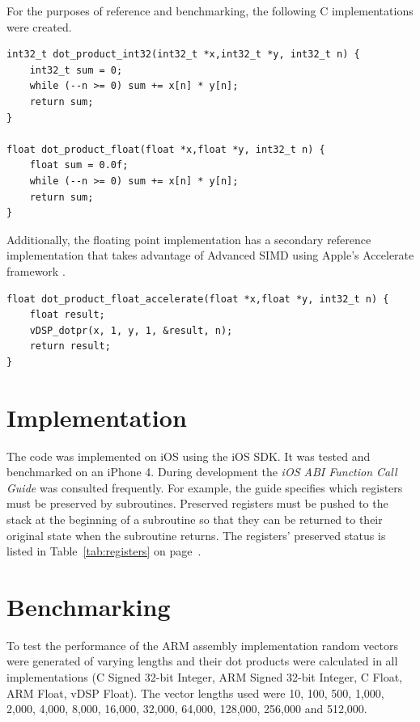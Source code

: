 \documentclass[oneside,a4paper]{report}
\begin{document}
For the purposes of reference and benchmarking, the following C implementations were created.

\begin{lstlisting}[language={AssemblerC}]
int32_t dot_product_int32(int32_t *x,int32_t *y, int32_t n) {
    int32_t sum = 0;
    while (--n >= 0) sum += x[n] * y[n];
    return sum;
}

float dot_product_float(float *x,float *y, int32_t n) {
    float sum = 0.0f;
    while (--n >= 0) sum += x[n] * y[n];
    return sum;
}
\end{lstlisting}

Additionally, the floating point implementation has a secondary reference implementation that takes advantage of Advanced SIMD using Apple's Accelerate framework \cite{Accelerate}.

\begin{lstlisting}[language={AssemblerC}]
float dot_product_float_accelerate(float *x,float *y, int32_t n) {
    float result;
    vDSP_dotpr(x, 1, y, 1, &result, n);
    return result;
}
\end{lstlisting}

\section{Implementation}
The code was implemented on iOS using the iOS SDK. It was tested and benchmarked on an iPhone 4. During development the \emph{iOS ABI Function Call Guide} \cite{iOSABI} was consulted frequently. For example, the guide specifies which registers must be preserved by subroutines. Preserved registers must be pushed to the stack at the beginning of a subroutine so that they can be returned to their original state when the subroutine returns. The registers' preserved status is listed in Table~\ref{tab:registers} on page~\pageref{tab:registers}.

\section{Benchmarking}

To test the performance of the ARM assembly implementation random vectors were generated of varying lengths and their dot products were calculated in all implementations (C Signed 32-bit Integer, ARM Signed 32-bit Integer, C Float, ARM Float, vDSP Float). The vector lengths used were 10, 100, 500, 1,000, 2,000, 4,000, 8,000, 16,000, 32,000, 64,000, 128,000, 256,000 and 512,000.
\end{document}
